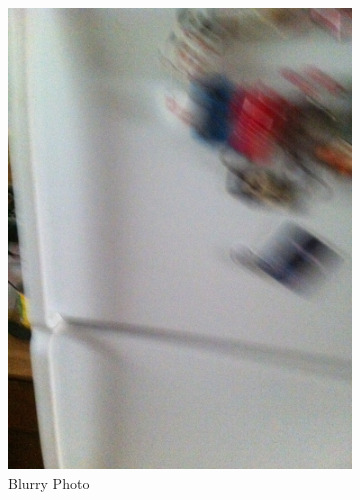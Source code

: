 \documentclass[sigconf]{acmart}
\begin{document}
\begin{figure}[hbp]
        \centering
        \begin{subfigure}[b]{0.3\columnwidth}
                \includegraphics[width=\textwidth]{images/blurry.jpg}  
                \caption{Blurry Photo}
                \label{fig:blur}
        \end{subfigure}%
        ~ 
        \begin{subfigure}[b]{0.3\columnwidth}

\end{subfigure}
\end{figure}
\end{document}
